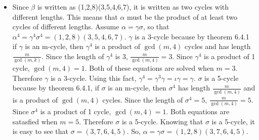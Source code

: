 \documentclass[titlepage]{article}
\newenvironment{problem}[2][Problem]{\begin{trivlist}
\item[\hskip \labelsep {\bfseries #1}\hskip \labelsep {\bfseries #2.}]}{\end{trivlist}}
\begin{document}
\begin{problem}{5}
\begin{itemize}
\item[(b)] Since $\beta$ is written as (1,2,8)(3,5,4,6,7), it is written as two cycles with different lengths. This means that $\alpha$ must be the product of at least two cycles of different lengths. Assume $\alpha = \gamma\sigma$, so that $\alpha^4 = \gamma^4\sigma^4 = (1,2,8)(3,5,4,6,7)$. $\gamma$ is a 3-cycle because by theorem 6.4.1 if $\gamma$ is an m-cycle, then $\gamma^4$ is a product of $\gcd(m,4)$ cycles and has length $\frac{m}{\gcd(m,k)}$. Since the length of $\gamma^4$ is 3, $\frac{m}{\gcd(m,4)} = 3$. Since $\gamma^4$ is a product of 1 cycle, $\gcd(m,4) = 1$. Both of these equations are solved when $m=3$. Therefore $\gamma$ is a 3-cycle. Using this fact, $\gamma^4 = \gamma^3 \gamma = \iota \gamma = \gamma$. $\sigma$ is a 5-cycle because by theorem 6.4.1, if $\sigma$ is an m-cycle, then $\sigma^4$ has length $\frac{m}{\gcd(m,4)}$ and is a product of $\gcd(m,4)$ cycles. Since the length of $\sigma^4 = 5$, $\frac{m}{\gcd(m,4)} = 5$. Since $\sigma^4$ is a product of 1 cycle, $\gcd(m,4) = 1$. Both equations are satasfied when $m=5$. Therefore $\sigma$ is a 5-cycle. Knowing that $\sigma$ is a 5-cycle, it is easy to see that $\sigma = (3,7,6,4,5)$. So, $\alpha = \gamma\sigma =(1,2,8)(3,7,6,4,5)$.
\end{itemize}
\end{problem}
\end{document}

